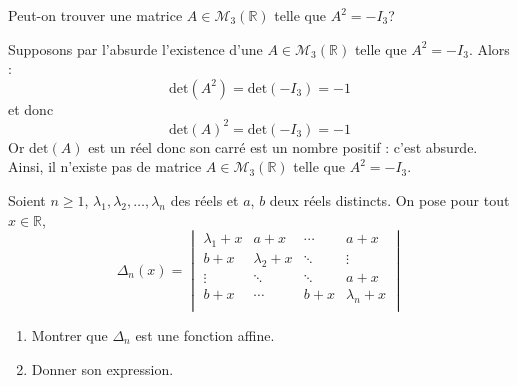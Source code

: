 \documentclass[a4paper,10pt]{report}
\begin{document}
\begin{Exercice}{} Peut-on trouver une matrice $A \in \mathcal{M}_3(\mathbb{R})$ telle que $A^2= - I_3$?
\end{Exercice}

\corr Supposons par l'absurde l'existence d'une $A \in \mathcal{M}_3(\mathbb{R})$ telle que $A^2= - I_3$. Alors :
$$ \textrm{det}(A^2) = \textrm{det}(-I_3) = - 1$$
et donc 
$$ \textrm{det}(A)^2 = \textrm{det}(-I_3) = - 1$$
Or $\textrm{det}(A)$ est un réel donc son carré est un nombre positif : c'est absurde. Ainsi, il n'existe pas de matrice $A \in \mathcal{M}_3(\mathbb{R})$ telle que $A^2= - I_3$.

\begin{Exercice}{} Soient $n \geq 1$, $\lambda_1 ,\lambda_2 ,\ldots,\lambda_n$ des réels et $a$, $b$ deux réels distincts. On pose pour tout $x \in \mathbb{R}$,
    \[
    \Delta_n(x) =
    \begin{vmatrix}
        {\lambda_1 + x} & {a + x} & \cdots & {a + x} \\
        {b + x} & {\lambda_2 + x} & \ddots & \vdots \\
        \vdots & \ddots & \ddots & {a + x} \\
        {b + x} & \cdots & {b + x} & {\lambda_n + x} \\
    \end{vmatrix}    
    \]
    \begin{enumerate}
      \item Montrer que $\Delta_n$ est une fonction affine.
      \item Donner son expression.
    \end{enumerate}
\end{Exercice}

\corr 
\end{document}
